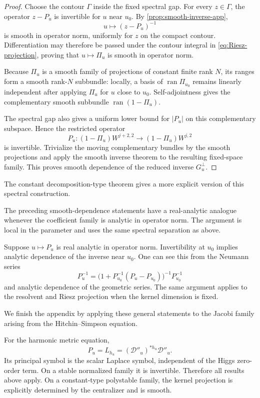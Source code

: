 \documentclass[11pt,reqno]{amsart}
\theoremstyle{definition}
\theoremstyle{remark}
\newcommand{\cD}{\mathcal D}
\begin{document}
\begin{proof}
Choose the contour $\Gamma$ inside the fixed spectral gap.  For every $z\in\Gamma$, the operator $z-P_u$ is invertible for $u$ near $u_0$.  By \cref{prop:smooth-inverse-app},
\[
  u\longmapsto (z-P_u)^{-1}
\]
is smooth in operator norm, uniformly for $z$ on the compact contour.  Differentiation may therefore be passed under the contour integral in \eqref{eq:Riesz-projection}, proving that $u\mapsto\Pi_u$ is smooth in operator norm.

Because $\Pi_u$ is a smooth family of projections of constant finite rank $N$, its ranges form a smooth rank-$N$ subbundle: locally, a basis of $\operatorname{ran}\Pi_{u_0}$ remains linearly independent after applying $\Pi_u$ for $u$ close to $u_0$.  Self-adjointness gives the complementary smooth subbundle $\operatorname{ran}(1-\Pi_u)$.

The spectral gap also gives a uniform lower bound for $|P_u|$ on this complementary subspace.  Hence the restricted operator
\[
  P_u:(1-\Pi_u)W^{j+2,2}\to(1-\Pi_u)W^{j,2}
\]
is invertible.  Trivialize the moving complementary bundles by the smooth projections and apply the smooth inverse theorem to the resulting fixed-space family.  This proves smooth dependence of the reduced inverse $G_u^\perp$.
\end{proof}

The constant decomposition-type theorem gives a more explicit version of this spectral construction.

The preceding smooth-dependence statements have a real-analytic analogue whenever the coefficient family is analytic in operator norm.  The argument is local in the parameter and uses the same spectral separation as above.

Suppose $u\mapsto P_u$ is real analytic in operator norm.  Invertibility at $u_0$ implies analytic dependence of the inverse near $u_0$.  One can see this from the Neumann series
\[
  P_u^{-1}
  =\bigl(1+P_{u_0}^{-1}(P_u-P_{u_0})\bigr)^{-1}P_{u_0}^{-1}
\]
and analytic dependence of the geometric series.  The same argument applies to the resolvent and Riesz projection when the kernel dimension is fixed.


We finish the appendix by applying these general statements to the Jacobi family arising from the Hitchin--Simpson equation.


For the harmonic metric equation,
\[
  P_u=L_{h_u}=(\cD''_u)^{*h_u}\cD''_u.
\]
Its principal symbol is the scalar Laplace symbol, independent of the Higgs zero-order term.  On a stable normalized family it is invertible.  Therefore all results above apply.  On a constant-type polystable family, the kernel projection is explicitly determined by the centralizer and is smooth.
\end{document}
